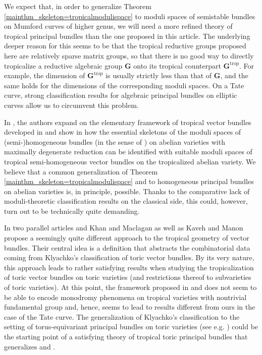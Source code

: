 \documentclass[10pt, a4paper]{amsart}
\theoremstyle{definition}
\theoremstyle{myitemstyle}
\newcommand{\bfG}{\mathbf{G}}
\newcommand{\trop}{{\mathrm{trop}}}
\begin{document}
We expect that, in order to generalize Theorem \ref{mainthm_skeleton=tropicalmodulispace} to moduli spaces of semistable bundles on Mumford curves of higher genus, we will need a more refined theory of tropical principal bundles than the one proposed in this article. The underlying deeper reason for this seems to be that the tropical reductive groups proposed here are relatively sparse matrix groups, so that there is no good way to directly tropicalize a reductive algebraic group $\bfG$ onto its tropical counterpart $\bfG^{\trop}$. For example, the dimension of $\bfG^{\trop}$ is usually strictly less than that of $\bfG$, and the same holds for the dimensions of the corresponding moduli spaces. On a Tate curve, strong classification results for algebraic principal bundles on elliptic curves allow us to circumvent this problem.



In \cite{GKUZ}, the authors expand on the elementary framework of tropical vector bundles developed in \cite{2022GrossUlirschZakharov} and show in \cite[Theorem B]{GKUZ} how the essential skeletons of the moduli spaces of (semi-)homogeneous bundles (in the sense of \cite{Mukai}) on abelian varieties with maximally degenerate reduction can be identified with suitable moduli spaces of tropical semi-homogeneous vector bundles on the tropicalized abelian variety. We believe that a common generalization of Theorem \ref{mainthm_skeleton=tropicalmodulispace} and \cite[Theorem B]{GKUZ} to homogeneous principal bundles on abelian varieties is, in principle, possible. Thanks to the comparative lack of moduli-theoretic classification results on the classical side, this could, however, turn out to be technically quite demanding. 

In two parallel articles \cite{KhanMaclagan_tropicaltoricvectorbundles} and \cite{KavehManon_tropicaltoricvectorbundles}  Khan and Maclagan as well as Kaveh and Manon propose a seemingly quite different approach to the tropical geometry of vector bundles. Their central idea is a definition that abstracts the combinatorial data coming from Klyachko's classification of toric vector bundles. By its very nature, this approach leads to rather satisfying results when studying the tropicalization of toric vector bundles on toric varieties (and restrictions thereof to subvarieties of toric varieties). At this point, the framework proposed in \cite{KavehManon_tropicaltoricvectorbundles} and \cite{KhanMaclagan_tropicaltoricvectorbundles} does not seem to be able to encode monodromy phenomena on tropical varieties with nontrivial fundamental group and, hence, seems to lead to results different from ours in the case of the Tate curve. The generalization of Klyachko's classification to the setting of torus-equivariant principal bundles on toric varieties (see e.g. \cite{KavehManon_toricprincipalbundles}) could be the starting point of a satisfying theory of tropical toric principal bundles that generalizes 
\cite{KhanMaclagan_tropicaltoricvectorbundles} and \cite{KavehManon_tropicaltoricvectorbundles}. 
\end{document}
